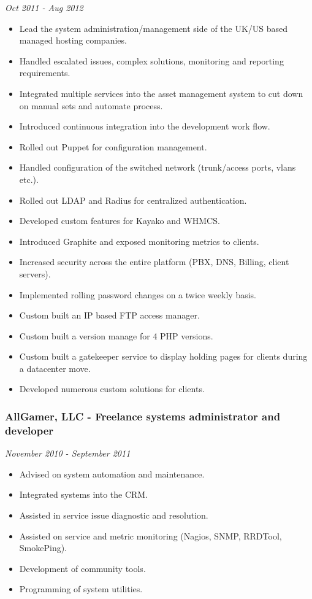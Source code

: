 \emph{Oct 2011 - Aug 2012}

\begin{itemize}
\item
  Lead the system administration/management side of the UK/US based
  managed hosting companies.
\item
  Handled escalated issues, complex solutions, monitoring and reporting
  requirements.
\item
  Integrated multiple services into the asset management system to cut
  down on manual sets and automate process.
\item
  Introduced continuous integration into the development work flow.
\item
  Rolled out Puppet for configuration management.
\item
  Handled configuration of the switched network (trunk/access ports,
  vlans etc.).
\item
  Rolled out LDAP and Radius for centralized authentication.
\item
  Developed custom features for Kayako and WHMCS.
\item
  Introduced Graphite and exposed monitoring metrics to clients.
\item
  Increased security across the entire platform (PBX, DNS, Billing,
  client servers).
\item
  Implemented rolling password changes on a twice weekly basis.
\item
  Custom built an IP based FTP access manager.
\item
  Custom built a version manage for 4 PHP versions.
\item
  Custom built a gatekeeper service to display holding pages for clients
  during a datacenter move.
\item
  Developed numerous custom solutions for clients.
\end{itemize}

\subsubsection{AllGamer, LLC - Freelance systems administrator and
developer}

\emph{November 2010 - September 2011}

\begin{itemize}
\item
  Advised on system automation and maintenance.
\item
  Integrated systems into the CRM.
\item
  Assisted in service issue diagnostic and resolution.
\item
  Assisted on service and metric monitoring (Nagios, SNMP, RRDTool,
  SmokePing).
\item
  Development of community tools.
\item
  Programming of system utilities.
\end{itemize}

